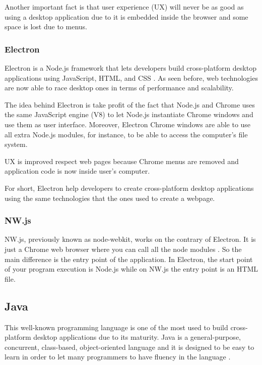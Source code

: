 Another important fact is that user experience (UX) will never be as good as
using a desktop application due to it is embedded inside the browser and some
space is lost due to menus.


\subsubsection{Electron}

Electron is a Node.js framework that lets developers build cross-platform
desktop applications using JavaScript, HTML, and CSS \cite{electron-web}. As
seen before, web technologies are now able to race desktop ones in terms of
performance and scalability.

The idea behind Electron is take profit of the fact that Node.js and Chrome uses
the same JavaScript engine (V8) to let Node.js instantiate Chrome windows and
use them as user interface. Moreover, Electron Chrome windows are able to use
all extra Node.js modules, for instance, to be able to access the computer's
file system.

UX is improved respect web pages because Chrome menus are removed and
application code is now inside user's computer.

For short, Electron help developers to create cross-platform desktop 
applications using the same technologies that the ones used to create a webpage.

\subsubsection{NW.js}

NW.js, previously known as node-webkit, works on the contrary of Electron. It
is just a Chrome web browser where you can call all the node modules
\cite{nwjs-web}. So the main difference is the entry point of the application.
In Electron, the start point of your program execution is Node.js while on
NW.js the entry point is an HTML file.

\subsection{Java}

This well-known programming language is one of the most used to build
cross-platform desktop applications due to its maturity. Java is a
general-purpose, concurrent, class-based, object-oriented language and it is
designed to be easy to learn in order to let many programmers to have fluency
in the language \cite{java-8-specs}.

